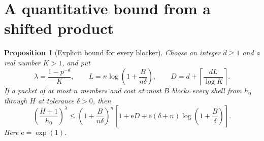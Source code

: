 \documentclass[11pt]{article}
\newtheorem{proposition}[theorem]{Proposition}
\theoremstyle{remark}\newtheorem{remark}[theorem]{Remark}
\begin{document}
\section{A quantitative bound from a shifted product}
\begin{proposition}[Explicit bound for every blocker]\label{prop:explicit}
Choose an integer $d\ge1$ and a real number $K>1$, and put
\[
 \lambda=\frac{1-p^{-d}}K,\qquad
 L=n\log\left(1+\frac{B}{n\delta}\right),\qquad
 D=d+\left\lceil\frac{dL}{\log K}\right\rceil.
\]
If a packet of at most $n$ members and cost at most $B$ blocks every shell from
$h_0$ through $H$ at tolerance $\delta>0$, then
\begin{equation}\label{eq:explicit}
 \left(\frac{H+1}{h_0}\right)^\lambda
 \le\left(1+\frac{B}{n\delta}\right)^n
 \left[1+\mathrm e D+
       \mathrm e(\delta+n)\log\left(1+\frac B\delta\right)\right].
\end{equation}
Here $\mathrm e=\exp(1)$.
\end{proposition}
\end{document}
